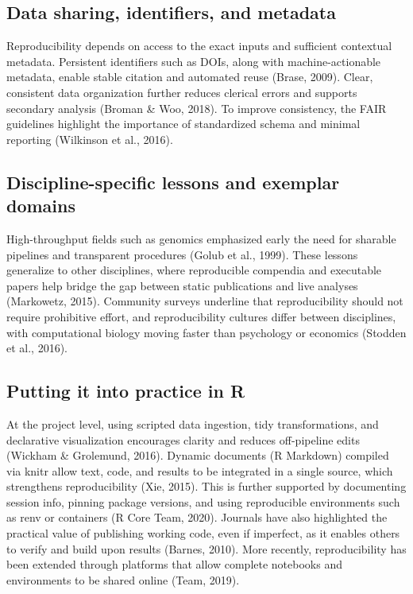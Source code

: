\documentclass[
  a4paper,
]{article}
\begin{document}
\subsection{Data sharing, identifiers, and
metadata}\label{data-sharing-identifiers-and-metadata}

Reproducibility depends on access to the exact inputs and sufficient
contextual metadata. Persistent identifiers such as DOIs, along with
machine-actionable metadata, enable stable citation and automated reuse
(Brase, 2009). Clear, consistent data organization further reduces
clerical errors and supports secondary analysis (Broman \& Woo, 2018).
To improve consistency, the FAIR guidelines highlight the importance of
standardized schema and minimal reporting (Wilkinson et al., 2016).

\subsection{Discipline-specific lessons and exemplar
domains}\label{discipline-specific-lessons-and-exemplar-domains}

High-throughput fields such as genomics emphasized early the need for
sharable pipelines and transparent procedures (Golub et al., 1999).
These lessons generalize to other disciplines, where reproducible
compendia and executable papers help bridge the gap between static
publications and live analyses (Markowetz, 2015). Community surveys
underline that reproducibility should not require prohibitive effort,
and reproducibility cultures differ between disciplines, with
computational biology moving faster than psychology or economics
(Stodden et al., 2016).

\subsection{Putting it into practice in
R}\label{putting-it-into-practice-in-r}

At the project level, using scripted data ingestion, tidy
transformations, and declarative visualization encourages clarity and
reduces off-pipeline edits (Wickham \& Grolemund, 2016). Dynamic
documents (R Markdown) compiled via knitr allow text, code, and results
to be integrated in a single source, which strengthens reproducibility
(Xie, 2015). This is further supported by documenting session info,
pinning package versions, and using reproducible environments such as
renv or containers (R Core Team, 2020). Journals have also highlighted
the practical value of publishing working code, even if imperfect, as it
enables others to verify and build upon results (Barnes, 2010). More
recently, reproducibility has been extended through platforms that allow
complete notebooks and environments to be shared online (Team, 2019).
\end{document}
